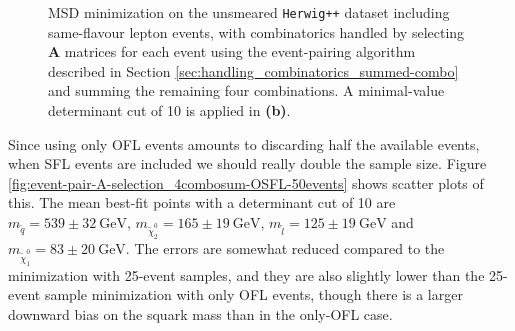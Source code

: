 \documentclass[twoside,english]{uiofysmaster}
\begin{document}
\begin{figure}[hbt]
\begin{subfigure}[b]{0.45\textwidth}
		\caption{ }
		\label{fig:event-pair-A-selection_4combosum-OSFL_b} 
	\end{subfigure}
	\caption{MSD minimization on the unsmeared {\tt Herwig++} dataset including same-flavour lepton events, with combinatorics handled by selecting $\mathbf{A}$ matrices for each event using the event-pairing algorithm described in Section \ref{sec:handling_combinatorics_summed-combo} and summing the remaining four combinations. A minimal-value determinant cut of 10 is applied in {\bf (b)}.}
	\label{fig:event-pair-A-selection_4combosum-OSFL}
\end{figure}

Since using only OFL events amounts to discarding half the available events, when SFL events are included we should really double the sample size. Figure \ref{fig:event-pair-A-selection_4combosum-OSFL-50events} shows scatter plots of this. The mean best-fit points with a determinant cut of 10 are $m_{\tilde q} = 539 \pm 32~\mathrm{GeV}$, $m_{\tilde \chi_2^0}= 165 \pm 19~\mathrm{GeV}$, $m_{\tilde l} = 125 \pm 19~\mathrm{GeV}$ and $m_{\tilde\chi_1^0} = 83 \pm 20~\mathrm{GeV}$. The errors are somewhat reduced compared to the minimization with 25-event samples, and they are also slightly lower than the 25-event sample minimization with only OFL events, though there is a larger downward bias on the squark mass than in the only-OFL case.
\end{document}
